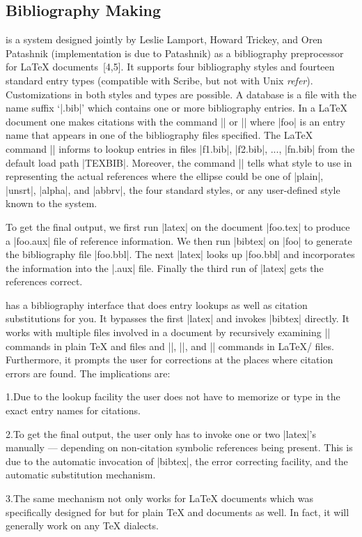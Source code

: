 {\begin{env}
\begin{minipage}
\section{Bibliography Making}

\noindent
{\BibTeX} is a system designed jointly by Leslie Lamport, Howard Trickey,
and Oren Patashnik (implementation is due to Patashnik)
as a bibliography preprocessor for {\LaTeX} documents~[4,5].
It supports four bibliography styles and fourteen standard entry types
(compatible with Scribe, but not with Unix \hbox{\it refer\/}).
Customizations in both styles and types are possible.
A {\BibTeX} database is a file with the name suffix `|.bib|'
which contains one or more bibliography entries.
In a {\LaTeX} document one makes citations with the command |\cite{foo}| or
|\nocite{foo}| where |foo| is an entry name that appears in one of 
the bibliography files specified. 
The {\LaTeX} command ||
informs {\BibTeX} to lookup entries in files |f1.bib|, |f2.bib|, ..., |fn.bib|
from the default load path |TEXBIB|.  Moreover, the command 
\hbox{||} tells {\BibTeX} what style to use in
representing the actual references where the ellipse could be one of
|plain|, |unsrt|, |alpha|, and |abbrv|, the four standard styles, 
or any user-defined style known to the system.

To get the final output, we first run |latex| on the document |foo.tex|
to produce a |foo.aux| file of reference information.  
We then run |bibtex| on |foo| to generate the bibliography 
file |foo.bbl|.  The next |latex| looks up |foo.bbl| and incorporates
the information into the |.aux| file.  
Finally the third run of |latex| gets the references correct.

{\TM} has a bibliography interface that does entry lookups as well
as citation substitutions for you.  It bypasses
the first |latex| and invokes |bibtex| directly.  It works with
multiple files involved in a document by recursively examining
|| commands in plain {\TeX} and {\AmSTeX}
files and ||, ||,
and || commands in {\LaTeX}/{\SliTeX} files.  Furthermore, it prompts
the user for corrections at the places where citation errors are found.
The implications are:
\item{1.}{Due to the lookup facility the user does not have to memorize
          or type in the exact entry names for citations.}
\item{2.}{To get the final output, the user only has to invoke
          one or two |latex|'s manually --- depending on non-citation
	  symbolic references being present.  This is due to the automatic
	  invocation of |bibtex|, the error correcting facility,
          and the automatic substitution mechanism.}
\item{3.}{The same mechanism not only works for {\LaTeX} documents
          which {\BibTeX} was specifically designed for but for plain
	  {\TeX} and {\AmSTeX} documents as well.  In fact, it
	  will generally work on any {\TeX} dialects.}


\end{minipage}
\end{env}}
